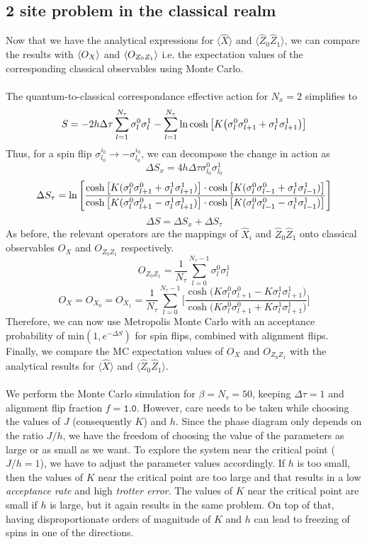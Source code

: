 \documentclass[../journal_main.tex]{subfiles}
\begin{document}
\subsection{2 site problem in the classical realm}
Now that we have the analytical expressions for $\langle \hat{X} \rangle$ and $\langle \hat{Z}_0 \hat{Z}_1 \rangle$, we can compare the results with $\expval{O_{X}}$ and $\expval{O_{Z_0 Z_1}}$ i.e. the expectation values of the corresponding classical observables using Monte Carlo.~\\~\\
The quantum-to-classical correspondance effective action for $N_x = 2$ simplifies to 
\[
    S = - 2h \Delta \tau \sum_{l=1}^{N_\tau} \sigma^{0}_l \sigma^{1}_{l} - \sum_{l=1}^{N_\tau} \ln \cosh \qty[K \qty(\sigma^0_l \sigma^0_{l+1} + \sigma^1_l \sigma^1_{l+1})] 
\]  
Thus, for a spin flip $\sigma^{i_0}_{l_0} \to - \sigma^{i_0}_{l_0}$, we can decompose the change in action as 
\[
    \Delta S_x = 4 h \Delta \tau \sigma^{0}_{l_0} \sigma^{1}_{l_0}  
\]
\[
    \Delta S_\tau = \ln \qty[ \frac{\cosh\qty[K(\sigma^{0}_{l} \sigma^{0}_{l+1} + \sigma^{1}_{l} \sigma^{1}_{l+1} )] \cdot \cosh\qty[K(\sigma^{0}_{l} \sigma^{0}_{l-1} + \sigma^{1}_{l} \sigma^{1}_{l-1} )] }{\cosh\qty[K(\sigma^{0}_{l} \sigma^{0}_{l+1} - \sigma^{1}_{l} \sigma^{1}_{l+1} )] \cdot \cosh\qty[K(\sigma^{0}_{l} \sigma^{0}_{l-1} - \sigma^{1}_{l} \sigma^{1}_{l-1} )]}  ]
\]
\[
    \Delta S = \Delta S_x + \Delta S_\tau 
\]
As before, the relevant operators are the mappings of $\hat{X}_i$ and $\hat{Z}_0 \hat{Z}_1$ onto classical observables $O_{X}$ and $O_{Z_0 Z_1}$ respectively.
\[
    O_{Z_0 Z_1} = \frac{1}{N_\tau} \sum_{l=0}^{N_\tau - 1} \sigma^0_l \sigma^1_l
\]
\[
    O_X = O_{X_0} = O_{X_1} = \frac{1}{N_\tau} \sum_{l=0}^{N_\tau -1} \Bigg[\frac{\cosh\big( K \sigma^0_l \sigma^0_{l+1} - K \sigma^1_l \sigma^1_{l+1} \big)}{\cosh\big( K \sigma^0_l \sigma^0_{l+1} + K \sigma^1_l \sigma^1_{l+1} \big)}  \Bigg]
\]
Therefore, we can now use Metropolis Monte Carlo with an acceptance probability of $\text{min} (1, e^{-\Delta S})$ for spin flips, combined with alignment flips. Finally, we compare the MC expectation values of $O_X$ and $O_{Z_0 Z_1}$ with the analytical results for $\langle \hat{X} \rangle$ and $\langle \hat{Z}_0 \hat{Z}_1\rangle$.~\\~\\
We perform the Monte Carlo simulation for $\beta = N_\tau = 50$, keeping $\Delta \tau = 1$ and alignment flip fraction $f = \texttt{1.0}$. However, care needs to be taken while choosing the values of $J$ (consequently $K$) and $h$. Since the phase diagram only depends on the ratio $J/h$, we have the freedom of choosing the value of the parameters as large or as small as we want. To explore the system near the critical point ($J/h = 1$), we have to adjust the parameter values accordingly. If $h$ is too small, then the values of $K$ near the critical point are too large and that results in a low \textit{acceptance rate} and high \textit{trotter error}. The values of $K$ near the critical point are small if $h$ is large, but it again results in the same problem. On top of that, having disproportionate orders of magnitude of $K$ and $h$ can lead to freezing of spins in one of the directions.~\\~\\
\end{document}
